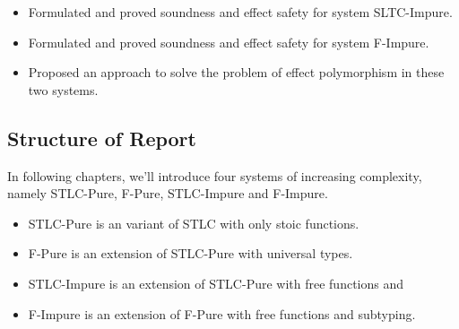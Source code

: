 \begin{itemize}
  \item Formulated and proved soundness and effect safety for system
    SLTC-Impure.
  \item Formulated and proved soundness and effect safety for system
    F-Impure.
  \item Proposed an approach to solve the problem of effect
    polymorphism in these two systems.
\end{itemize}

\subsection{Structure of Report}

In following chapters, we'll introduce four systems of increasing
complexity, namely STLC-Pure, F-Pure, STLC-Impure and F-Impure.

\begin{itemize}
\item STLC-Pure is an variant of STLC with only stoic functions.
\item F-Pure is an extension of STLC-Pure with universal types.
\item STLC-Impure is an extension of STLC-Pure with free functions and
\item F-Impure is an extension of F-Pure with free functions and
  subtyping.
\end{itemize}
